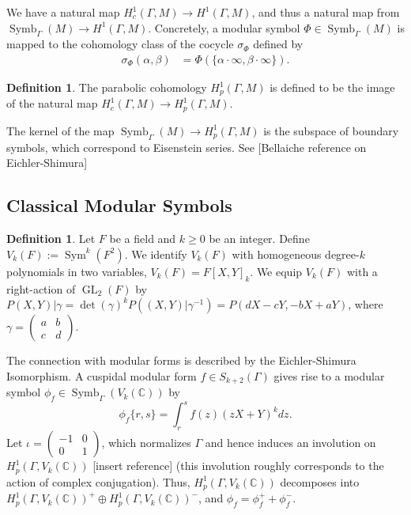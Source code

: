 \documentclass[10pt]{amsart}
\theoremstyle{plain}
\theoremstyle{definition}
\newtheorem{definition}[theorem]{Definition}
\newcommand{\CC}{{\mathbb{C}}}
\newcommand{\cH}{\mathcal{H}}
\DeclareMathOperator{\GL}{GL}
\DeclareMathOperator{\Sym}{Sym}
\DeclareMathOperator{\Symb}{Symb}
\begin{document}


We have a natural map $H^1_c(\Gamma, M)\longrightarrow H^1(\Gamma,M)$, and thus a natural map from $\Symb_\Gamma(M)\longrightarrow H^1(\Gamma,M)$. Concretely, a modular symbol $\Phi\in \Symb_\Gamma(M)$ is mapped to the cohomology class of the cocycle $\sigma_\Phi$ defined by
\begin{align}
\sigma_{\Phi}(\alpha, \beta) &= \Phi(\{\alpha \cdot \infty, \beta \cdot \infty\}).%
\end{align}
\begin{definition}
The parabolic cohomology $H^1_p(\Gamma,M)$ is defined to be the image of the natural map $H^1_c(\Gamma,M)\longrightarrow H^1_p(\Gamma,M)$.
\end{definition}
The kernel of the map $\Symb_\Gamma(M)\longrightarrow H^1_p(\Gamma,M)$ is the subspace of boundary symbols, which correspond to Eisenstein series. See [Bellaiche reference on Eichler-Shimura]



\subsection{Classical Modular Symbols}
\begin{definition}
Let $F$ be a field and $k\geq 0$ be an integer. Define $V_k(F):=\Sym^k(F^2)$. We identify $V_k(F)$ with homogeneous degree-$k$ polynomials in two variables, $V_k(F) = F[X,Y]_k$. We equip $V_k(F)$ with a right-action of $\GL_2(F)$ by $P(X,Y)|\gamma =\det(\gamma)^{k}P((X,Y)|\gamma^{-1})=P(dX-cY,-bX+aY)$, where $\gamma=\begin{pmatrix} a & b \\ c & d\end{pmatrix}$. 
\end{definition}
The connection with modular forms is described by the Eichler-Shimura Isomorphism. A cuspidal modular form $f\in S_{k+2}(\Gamma)$ gives rise to a modular symbol $\phi_{f}\in \Symb_{\Gamma} (V_k(\CC))$ by
\begin{equation*}
	\phi_{f} \{r, s\} = \int_r^s f(z) (zX+Y)^k dz.
\end{equation*}
Let $\iota = \begin{pmatrix} -1 & 0 \\ 0 & 1\end{pmatrix}$, which normalizes $\Gamma$ and hence induces an involution on $H^1_p(\Gamma, V_k(\CC))$ [insert reference] (this involution roughly corresponds to the action of complex conjugation). Thus, $H^1_p(\Gamma, V_k(\CC))$ decomposes into $H^1_p(\Gamma,V_k(\CC))^+\oplus H^1_p(\Gamma,V_k(\CC))^-$, and $\phi_f = \phi_f^+ + \phi_f^-$. 
\end{document}

